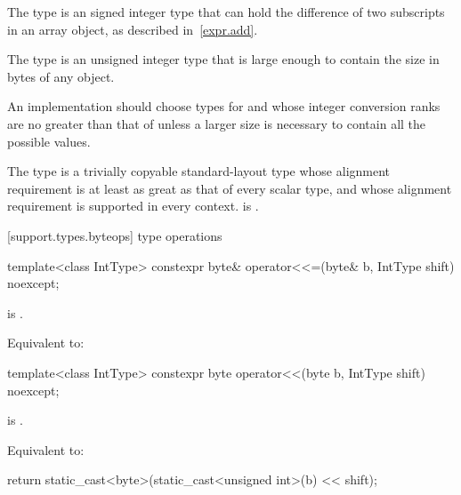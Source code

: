 \pnum
The type  is an
signed integer type that can
hold the difference of two subscripts in an array object, as described in~\ref{expr.add}.

\pnum
The type  is an
unsigned integer type that is large enough
to contain the size in bytes of any object.

\pnum
\recommended
An implementation should choose types for  and 
whose integer conversion ranks are no greater than that of
 unless a larger size is necessary to contain all the possible values.

\pnum
The type
%
 is a trivially copyable standard-layout type whose alignment requirement
is at least as great as that of every scalar type, and whose alignment
requirement is supported in every context.
 is .


[support.types.byteops]{ type operations}

%
\begin{itemdecl}
template<class IntType>
  constexpr byte& operator<<=(byte& b, IntType shift) noexcept;
\end{itemdecl}

\begin{itemdescr}
\pnum
\constraints
{} is .

\pnum
\effects
Equivalent to:
\end{itemdescr}

%
\begin{itemdecl}
template<class IntType>
  constexpr byte operator<<(byte b, IntType shift) noexcept;
\end{itemdecl}

\begin{itemdescr}
\pnum
\constraints
{} is .

\pnum
\effects
Equivalent to:
\begin{codeblock}
return static_cast<byte>(static_cast<unsigned int>(b) << shift);
\end{codeblock}
\end{itemdescr}

